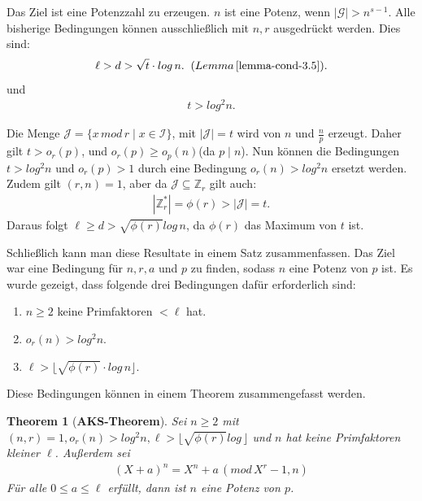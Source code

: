 \documentclass[12pt,oneside]{article}
\newtheorem{theorem}{Theorem}[section]
\theoremstyle{remark}
\theoremstyle{definition}
\begin{document}
\begin{flushleft}
Das Ziel ist eine Potenzzahl zu erzeugen. $n$ ist eine Potenz, wenn $|\mathcal{G}| > n^{s - 1}$. Alle bisherige Bedingungen können ausschließlich mit $n,r$ ausgedrückt werden. Dies sind:
\begin{align*}
    \ell > d > \sqrt{t} \cdot log \, n. \; \;  (Lemma \,  \ref{lemma-cond-3.5}).
\end{align*}
und 
\begin{align*}
    t > log^2 n.
\end{align*}


Die Menge $\mathcal{J} = \{ x \, mod \, r \mid x \in \mathcal{I} \}$, mit $|\mathcal{J}| = t$ wird von $n$ und $\frac{n}{p}$ erzeugt. Daher gilt $ t > o_{r}(p)$, und  $o_{r}(p) \geq o_{p}(n)$(da $p \mid n$). Nun können die Bedingungen $t > log^2n$ und $o_{r}(p) > 1$ durch eine Bedingung $o_{r}(n) > log^2 n$ ersetzt werden. Zudem gilt $(r,n) = 1$, aber da $\mathcal{J} \subseteq \mathbb{Z}_{r}$ gilt auch:
\begin{align*}
    |\mathbb{Z}_r^{*}| = \phi(r) > |\mathcal{J}| = t. 
\end{align*}
Daraus folgt $\ell \geq d > \sqrt{\phi(r)} log \, n$, da $\phi(r)$ das Maximum von $t$ ist.

Schließlich kann man diese Resultate in einem Satz zusammenfassen. Das Ziel war eine Bedingung für $n,r,a$ und $p$ zu finden, sodass $n$ eine Potenz von $p$ ist. Es wurde gezeigt, dass folgende drei Bedingungen dafür erforderlich sind:
\begin{enumerate}
    \item $n \geq 2$ keine Primfaktoren $< \ell$ hat.\newline
    
    \item $o_{r}(n) > log^2 n$.\newline
    
    \item $\ell > \lfloor \sqrt{\phi(r)} \cdot log \, n \rfloor $.\newline\newline
\end{enumerate}

Diese Bedingungen können in einem Theorem zusammengefasst werden.

\begin{theorem}[\textbf{AKS-Theorem}]\label{aks-main-theorem}
Sei $n \geq 2$ mit $(n,r) = 1, o_{r}(n) > log^2 n ,\ell > \lfloor \sqrt{\phi(r)} log \, \rfloor$ und $n$ hat keine Primfaktoren kleiner $\ell$. Außerdem sei
\begin{align*}
    (X + a)^n = X^n + a \, (mod  \, X^r - 1, n)
\end{align*}
Für alle $0 \leq a \leq \ell$ erfüllt, dann ist $n$ eine Potenz von $p$.
\end{theorem}


\end{flushleft}
\end{document}

